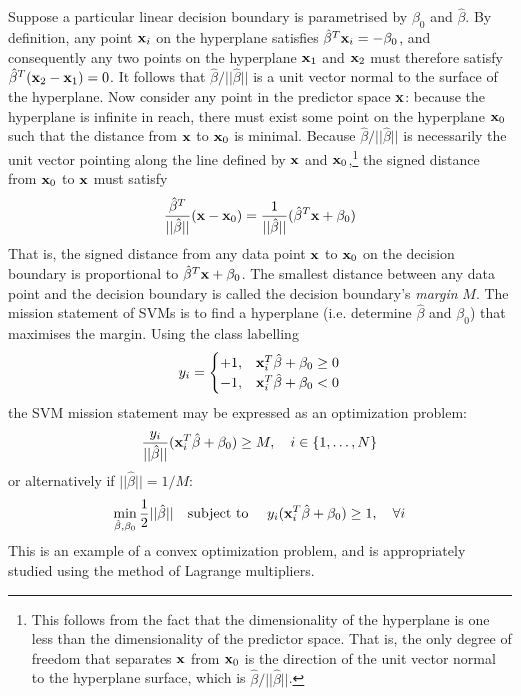 \documentclass[nofootinbib,reprint,english]{revtex4-1}
\begin{document}
Suppose a particular linear decision boundary is parametrised by \(\beta_0\) and \(\hat{\beta}\). By definition, any point \(\vb{x}_i\) on the hyperplane  satisfies \(\hat{\beta}^T\vb{x}_i=-\beta_0\), and consequently any two points on the hyperplane \(\vb{x}_1\) and \(\vb{x}_2\) must therefore satisfy \(\hat{\beta}^T(\vb{x}_2-\vb{x}_1)=0\). It follows that \(\hat{\beta}/||\hat{\beta}||\) is a unit vector normal to the surface of the hyperplane. Now consider any point in the predictor space \(\vb{x}\): because the hyperplane is infinite in reach, there must exist some point on the hyperplane \(\vb{x}_0\) such that the distance from \(\vb{x}\) to \(\vb{x}_0\) is minimal. Because \(\hat{\beta}/||\hat{\beta}||\) is necessarily the unit vector pointing along the line defined by \(\vb{x}\) and \(\vb{x}_0\),\footnote{This follows from the fact that the dimensionality of the hyperplane is one less than the dimensionality of the predictor space. That is, the only degree of freedom that separates \(\vb{x}\) from \(\vb{x}_0\) is the direction of the unit vector normal to the hyperplane surface, which is \(\hat{\beta}/||\hat{\beta}||\).} the signed distance from \(\vb{x}_0\) to \(\vb{x}\) must satisfy
\begin{equation}
\frac{\hat{\beta}^T}{||\hat{\beta}||}(\vb{x}-\vb{x}_0)=\frac{1}{||\hat{\beta}||}(\hat{\beta}^T\vb{x}+\beta_0)
\end{equation}
That is, the signed distance from any data point \(\vb{x}\) to \(\vb{x}_0\) on the decision boundary is proportional to \(\hat{\beta}^T\vb{x}+\beta_0\). The smallest distance between any data point and the decision boundary is called the decision boundary's \emph{margin} \(M\). The mission statement of SVMs is to find a hyperplane (i.e. determine \(\hat{\beta}\) and \(\beta_0\)) that maximises the margin. Using the class labelling
\begin{equation}
y_i=\begin{cases}+1,&\vb{x}_i^T\hat{\beta}+\beta_0\geq0\\-1,&\vb{x}_i^T\hat{\beta}+\beta_0<0\end{cases}
\end{equation}
the SVM mission statement may be expressed as an optimization problem:
\begin{equation}\label{eq:SVM_optimization_problem}
\frac{y_i}{||\hat{\beta}||}(\vb{x}_i^T\hat{\beta}+\beta_0)\geq M\qc i\in\{1,\ldots,N\}
\end{equation}
or alternatively if \(||\hat{\beta}||=1/M\):
\begin{equation}\label{eq:SVM_optimization_problem_Lagrange_form}
\min_{\hat{\beta},\beta_0}\frac{1}{2}||\hat{\beta}||\qq{subject to }y_i(\vb{x}_i^T\hat{\beta}+\beta_0)\geq1\qc\forall i
\end{equation}
This is an example of a convex optimization problem, and is appropriately studied using the method of Lagrange multipliers.
\end{document}
